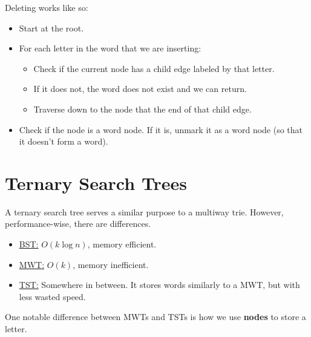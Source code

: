 \documentclass[letterpaper]{article}
\begin{document}
Deleting works like so: 
\begin{itemize}
    \item Start at the root. 
    \item For each letter in the word that we are inserting: 
    \begin{itemize}
        \item Check if the current node has a child edge labeled by that letter. 
        \item If it does not, the word does not exist and we can return. 
        \item Traverse down to the node that the end of that child edge. 
    \end{itemize}
    \item Check if the node is a word node. If it is, unmark it as a word node (so that it doesn't form a word). 
\end{itemize}










\newpage 
\section{Ternary Search Trees}
A ternary search tree serves a similar purpose to a multiway trie. However, performance-wise, there are differences. 
\begin{itemize}
    \item \underline{BST:} $O(k \log n)$, memory efficient. 
    \item \underline{MWT:} $O(k)$, memory inefficient. 
    \item \underline{TST:} Somewhere in between. It stores words similarly to a MWT, but with less wasted speed. 
\end{itemize}
One notable difference between MWTs and TSTs is how we use \textbf{nodes} to store a letter.
\end{document}
